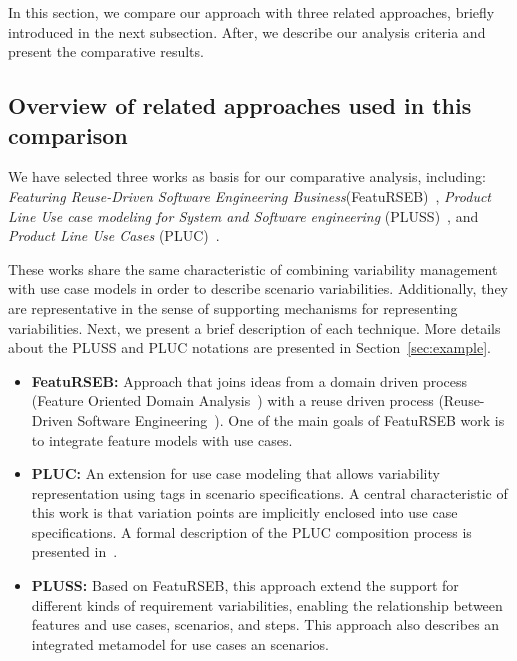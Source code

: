 \documentclass{acm_proc_article-sp}
\begin{document}
In this section, we compare our approach with three related approaches,
briefly introduced in the next subsection. After, we describe our
analysis criteria and present the comparative results.

\subsection{Overview of related approaches used in this comparison}

We have selected three works as basis for our comparative analysis,
including: \emph{Featuring Reuse-Driven Software Engineering
Business}(FeatuRSEB)~\cite{griss-icsr-1998}, \emph{Product Line Use
case modeling for System and Software engineering}
(PLUSS)~\cite{eriksson-splc-2005}, and \emph{Product Line Use Cases}
(PLUC)~\cite{bertolino-esec-2003}. 

These works share the same characteristic of combining variability management with use case models in order to
describe scenario variabilities. Additionally, they are representative in the sense of supporting 
mechanisms for representing variabilities. 
Next, we present a brief description of each technique. More details about the PLUSS and PLUC notations are presented 
in Section~\ref{sec:example}.

\begin{itemize}
\item{\bf FeatuRSEB:} Approach that joins
ideas from a domain driven process (Feature Oriented Domain
Analysis~\cite{kang-foda-report}) with a reuse driven process
(Reuse-Driven Software Engineering~\cite{jacobson-reuse-book}). One
of the main goals of FeatuRSEB work is to integrate feature models
with use cases.

\item{\bf PLUC:} An extension for use case modeling that allows variability
representation using tags in scenario specifications. A central
characteristic of this work is that variation points are
implicitly enclosed into use case specifications. A formal description of the PLUC composition
process is presented in~\cite{fantechi-splc-2004}.

\item{\bf PLUSS:} Based on FeatuRSEB, this approach extend the support for different
kinds of requirement variabilities, enabling the relationship between
features and use cases, scenarios, and steps. This approach also describes 
an integrated metamodel for use cases an scenarios.  
\end{itemize}
\end{document}
